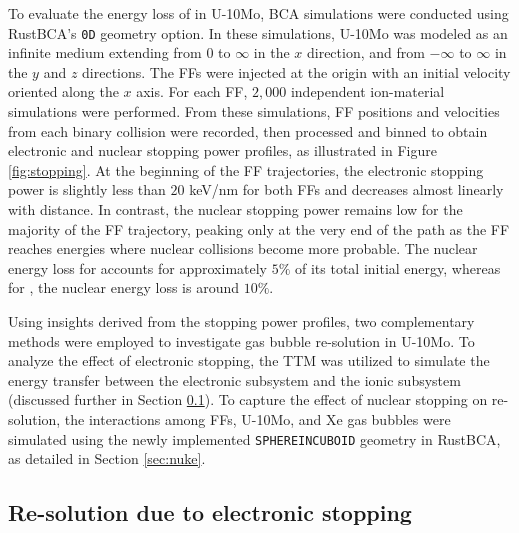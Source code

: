 \documentclass[review]{elsarticle}
\newcommand{\Y}{\ce{_{39}^{97}Y}\xspace}
\newcommand{\I}{\ce{_{53}^{136}I}\xspace}
\providecommand{\DIFadd}[1]{{\bf #1}} %
\providecommand{\DIFdel}[1]{} %
\providecommand{\DIFaddbegin}{\protect\color{blue}} %
\providecommand{\DIFaddend}{\protect\color{black}} %
\providecommand{\DIFdelbegin}{\protect\color{red}} %
\providecommand{\DIFdelend}{\protect\color{black}} %
\newcommand{\DIFscaledelfig}{0.5}
\newlength{\DIFdelgraphicswidth} %
\newlength{\DIFdelgraphicsheight} %
\newcommand{\DIFaddincludegraphics}[2][]{{\color{blue}\fbox{\DIFOincludegraphics[#1]{#2}}}} %
\newcommand{\DIFdelincludegraphics}[2][]{%
\sbox{\DIFdelgraphicsbox}{\DIFOincludegraphics[#1]{#2}}%
\settoboxwidth{\DIFdelgraphicswidth}{\DIFdelgraphicsbox} %
\settoboxtotalheight{\DIFdelgraphicsheight}{\DIFdelgraphicsbox} %
\scalebox{\DIFscaledelfig}{%
\parbox[b]{\DIFdelgraphicswidth}{\usebox{\DIFdelgraphicsbox}\\[-\baselineskip] \rule{\DIFdelgraphicswidth}{0em}}\llap{\resizebox{\DIFdelgraphicswidth}{\DIFdelgraphicsheight}{%
\setlength{\unitlength}{\DIFdelgraphicswidth}%
\begin{picture}(1,1)%
\thicklines\linethickness{2pt} %
{\color[rgb]{1,0,0}\put(0,0){\framebox(1,1){}}}%
{\color[rgb]{1,0,0}\put(0,0){\line( 1,1){1}}}%
{\color[rgb]{1,0,0}\put(0,1){\line(1,-1){1}}}%
\end{picture}%
}\hspace*{3pt}}} %
} %
\DeclareRobustCommand{\DIFaddbegin}{\DIFOaddbegin \let\includegraphics\DIFaddincludegraphics} %
\DeclareRobustCommand{\DIFaddend}{\DIFOaddend \let\includegraphics\DIFOincludegraphics} %
\DeclareRobustCommand{\DIFdelbegin}{\DIFOdelbegin \let\includegraphics\DIFdelincludegraphics} %
\DeclareRobustCommand{\DIFdelend}{\DIFOaddend \let\includegraphics\DIFOincludegraphics} %
\begin{document}
To evaluate the energy loss of \DIFdelbegin \DIFdel{these FFs }\DIFdelend \DIFaddbegin \Y \DIFadd{and }\I \DIFaddend in U-10Mo, BCA simulations were conducted using RustBCA's \texttt{0D} geometry option. In these simulations, U-10Mo was modeled as an infinite medium extending from $0$ to $\infty$ in the $x$ direction, and from $-\infty$ to $\infty $ in the $y$ and $z$ directions. The FFs were injected at the origin with an initial velocity oriented along the $x$ axis. For each FF, $2,000$ independent ion-material simulations were performed. From these simulations, FF positions and velocities from each binary collision were recorded, then processed and binned to obtain electronic and nuclear stopping power profiles, as illustrated in Figure \ref{fig:stopping}. At the beginning of the FF trajectories, the electronic stopping power is slightly less than $20$ keV/nm for both FFs and decreases almost linearly with distance. In contrast, the nuclear stopping power remains low for the majority of the FF trajectory, peaking only at the very end of the path as the FF reaches energies where nuclear collisions become more probable. The nuclear energy loss for \Y accounts for approximately $5\%$ of its total initial energy, whereas for \I, the nuclear energy loss is around $10\%$.

Using insights derived from the stopping power profiles, two complementary methods were employed to investigate gas bubble re-solution in U-10Mo. To analyze the effect of electronic stopping, the TTM was utilized to simulate the energy transfer between the electronic subsystem and the ionic subsystem (discussed further in Section \ref{sec:elec}). To capture the effect of nuclear stopping on re-solution, the interactions among FFs, U-10Mo, and Xe gas bubbles were simulated using the newly implemented \texttt{SPHEREINCUBOID} geometry in RustBCA, as detailed in Section \ref{sec:nuke}.

\subsection{Re-solution due to electronic stopping}
\label{sec:elec}
\end{document}

